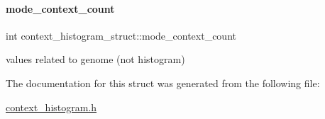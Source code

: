 \paragraph{\texorpdfstring{mode\+\_\+context\+\_\+count}{mode\_context\_count}}
{\footnotesize\ttfamily int context\+\_\+histogram\+\_\+struct\+::mode\+\_\+context\+\_\+count}

values related to genome (not histogram) 

The documentation for this struct was generated from the following file\+:\begin{DoxyCompactItemize}
\item 
\hyperlink{context__histogram_8h}{context\+\_\+histogram.\+h}\end{DoxyCompactItemize}
